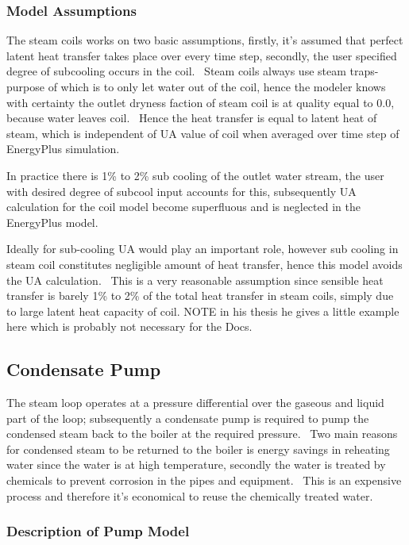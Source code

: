 \subsubsection{Model Assumptions}\label{model-assumptions-001}

The steam coils works on two basic assumptions, firstly, it's assumed that perfect latent heat transfer takes place over every time step, secondly, the user specified degree of subcooling occurs in the coil.~ Steam coils always use steam traps- purpose of which is to only let water out of the coil, hence the modeler knows with certainty the outlet dryness faction of steam coil is at quality equal to 0.0, because water leaves coil.~ Hence the heat transfer is equal to latent heat of steam, which is independent of UA value of coil when averaged over time step of EnergyPlus simulation.

In practice there is 1\% to 2\% sub cooling of the outlet water stream, the user with desired degree of subcool input accounts for this, subsequently UA calculation for the coil model become superfluous and is neglected in the EnergyPlus model.

Ideally for sub-cooling UA would play an important role, however sub cooling in steam coil constitutes negligible amount of heat transfer, hence this model avoids the UA calculation.~ This is a very reasonable assumption since sensible heat transfer is barely 1\% to 2\% of the total heat transfer in steam coils, simply due to large latent heat capacity of coil. NOTE in his thesis he gives a little example here which is probably not necessary for the Docs.

\subsection{Condensate Pump}\label{condensate-pump}

The steam loop operates at a pressure differential over the gaseous and liquid part of the loop; subsequently a condensate pump is required to pump the condensed steam back to the boiler at the required pressure.~ Two main reasons for condensed steam to be returned to the boiler is energy savings in reheating water since the water is at high temperature, secondly the water is treated by chemicals to prevent corrosion in the pipes and equipment.~ This is an expensive process and therefore it's economical to reuse the chemically treated water.

\subsubsection{Description of Pump Model}\label{description-of-pump-model}

